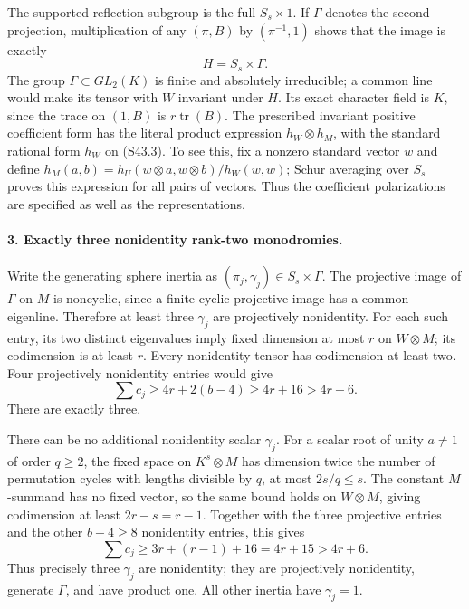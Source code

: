 The supported reflection subgroup is the full
\(S_s\times1\). If \(\Gamma\) denotes the second
projection, multiplication of any \((\pi,B)\) by
\((\pi^{-1},1)\) shows that the image is exactly
\[
                              H=S_s\times\Gamma.           \tag{S43.5}
\]
The group \(\Gamma\subset GL_2(K)\) is finite and
absolutely irreducible; a common line would make its tensor
with \(W\) invariant under \(H\). Its exact character
field is \(K\), since the trace on \((1,B)\) is
\(r\operatorname{tr}(B)\). The prescribed invariant
positive coefficient form has the literal product expression
\(h_W\otimes h_M\), with the standard rational form
\(h_W\) on (S43.3). To see this, fix a nonzero standard
vector \(w\) and define
\(h_M(a,b)=h_U(w\otimes a,w\otimes b)/h_W(w,w)\);
Schur averaging over \(S_s\) proves this expression for
all pairs of vectors. Thus the coefficient polarizations
are specified as well as the representations.

\paragraph{3. Exactly three nonidentity rank-two monodromies.}
Write the generating sphere inertia as
\((\pi_j,\gamma_j)\in S_s\times\Gamma\).
The projective image of \(\Gamma\) on \(M\) is
noncyclic, since a finite cyclic projective image has a
common eigenline. Therefore at least three \(\gamma_j\)
are projectively nonidentity. For each such entry, its two
distinct eigenvalues imply fixed dimension at most \(r\)
on \(W\otimes M\); its codimension is at least \(r\).
Every nonidentity tensor has codimension at least two.
Four projectively nonidentity entries would give
\[
                    \sum c_j\ge4r+2(b-4)
                                      \ge4r+16>4r+6.
                                                               \tag{S43.6}
\]
There are exactly three.

There can be no additional nonidentity scalar \(\gamma_j\).
For a scalar root of unity \(a\ne1\) of order \(q\ge2\),
the fixed space on \(K^s\otimes M\) has dimension twice
the number of permutation cycles with lengths divisible
by \(q\), at most \(2s/q\le s\). The constant
\(M\)-summand has no fixed vector, so the same bound
holds on \(W\otimes M\), giving codimension at least
\(2r-s=r-1\). Together with the three projective entries
and the other \(b-4\ge8\) nonidentity entries, this gives
\[
                   \sum c_j\ge3r+(r-1)+16
                                      =4r+15>4r+6.         \tag{S43.7}
\]
Thus precisely three \(\gamma_j\) are nonidentity;
they are projectively nonidentity, generate \(\Gamma\),
and have product one. All other inertia have
\(\gamma_j=1\).

